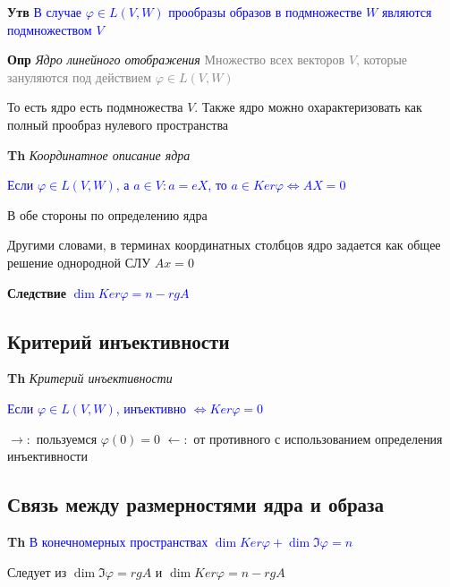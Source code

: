 \documentclass[a4paper, 14pt]{article}
\begin{document}
    \textbf{Утв} \textcolor{blue}{В случае $\varphi \in L(V, W)$ прообразы образов в подмножестве $W$ являются
    подмножеством $V$}

     \textbf{Опр} \textit{Ядро линейного отображения} \textcolor{gray}{Множество всех векторов $V$, которые зануляются
    под действием $\varphi \in L(V, W)$}

    То есть ядро есть подмножества $V$.
    Также ядро можно охарактеризовать как полный прообраз нулевого пространства

     \textbf{Th} \textit{Координатное описание ядра}

    \textcolor{blue}{Если $\varphi \in L(V, W)$, а $a \in V: a = eX$, то $a \in Ker \varphi \Leftrightarrow AX = 0$}

    В обе стороны по определению ядра

    Другими словами, в терминах координатных столбцов ядро задается как общее решение однородной СЛУ $Ax = 0$

    \textbf{Следствие} \textcolor{blue}{$\dim Ker \varphi = n - rg A$}

    \subsection{Критерий инъективности}

    \textbf{Th} \textit{Критерий инъективности}

    \textcolor{blue}{Если $\varphi \in L(V, W)$, инъективно
        $\Leftrightarrow Ker \varphi = 0$}

    $\rightarrow:$ пользуемся $\varphi(0) = 0$
    $\leftarrow:$ от противного с использованием определения инъективности

    \subsection{Связь между размерностями ядра и образа}

    \textbf{Th} \textcolor{blue}{В конечномерных пространствах $\dim Ker \varphi + \dim \Im \varphi = n$}

    Следует из $\dim \Im \varphi = rg A$ и $\dim Ker \varphi = n - rg A$
\end{document}

